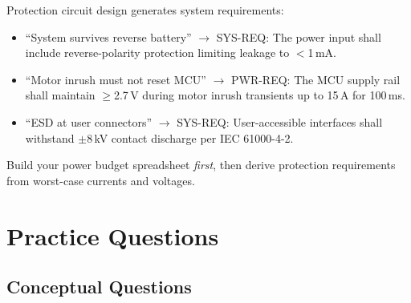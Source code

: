 \documentclass[11pt,letterpaper,twoside,openany]{book}
\begin{document}
\begin{keyconceptbox}
Protection circuit design generates system requirements:
\begin{itemize}[nosep,leftmargin=1.5em]
\item ``System survives reverse battery'' $\to$ SYS-REQ: The power input shall include reverse-polarity protection limiting leakage to $<$1\,mA.
\item ``Motor inrush must not reset MCU'' $\to$ PWR-REQ: The MCU supply rail shall maintain $\geq$2.7\,V during motor inrush transients up to 15\,A for 100\,ms.
\item ``ESD at user connectors'' $\to$ SYS-REQ: User-accessible interfaces shall withstand $\pm$8\,kV contact discharge per IEC 61000-4-2.
\end{itemize}
Build your power budget spreadsheet \emph{first}, then derive protection requirements from worst-case currents and voltages.
\end{keyconceptbox}


\section{Practice Questions}
\label{sec:practice}

\subsection{Conceptual Questions}
\end{document}
